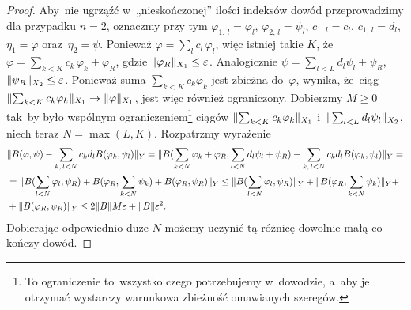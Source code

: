 \documentclass[a4paper,11pt]{article}
\begin{document}
\begin{proof}

  Aby~nie ugrząźć w~„nieskończonej” ilości indeksów dowód
  przeprowadzimy dla przypadku $n = 2$, oznaczmy przy tym
  $\varphi_{ 1,\, l } = \varphi_{ l }$, $\varphi_{ 2, \, l } = \psi_{ l }$,
  $c_{ 1, \, l } = c_{ l }$, $c_{ 1, \, l } = d_{ l }$,
  $\eta_{ 1 } = \varphi$ oraz~$\eta_{ 2 } = \psi$. Ponieważ
  $\varphi = \sum_{ l } c_{ l } \, \varphi_{ l }$, więc istniej takie $K$,
  że~$\varphi = \sum_{ k < K } c_{ k } \, \varphi_{ k } + \varphi_{ R }$, gdzie
  $\lVert{  \varphi_{ R }  }\rVert_{ X_{ 1 } } \leq \varepsilon$. Analogicznie
  $\psi = \sum_{ l < L } d_{ l } \psi_{ l } + \psi_{ R }$,
  $\lVert{  \psi_{ R }  }\rVert_{ X_{ 2 } } \leq \varepsilon$. Ponieważ suma
  $\sum_{ k < K } c_{ k } \varphi_{ k }$ jest zbieżna do~$\varphi$, wynika,
  że~ciąg
  $\lVert{  \sum_{ k < K } c_{ k } \varphi_{ k }  }\rVert_{ X_{ 1 } } \to \lVert{ 
    \varphi  }\rVert_{ X_{ 1 } }$, jest więc również ograniczony. Dobierzmy
  $M \geq 0$ tak~by było wspólnym ograniczeniem\footnote{To
    ograniczenie to~wszystko czego potrzebujemy w~dowodzie, a~aby je
    otrzymać wystarczy warunkowa zbieżność omawianych szeregów.}
  ciągów $\lVert{  \sum_{ k < K } c_{ k } \varphi_{ k }  }\rVert_{ X_{ 1 } }$
  i~$\lVert{  \sum_{ l < L } d_{ l } \psi_{ l }  }\rVert_{ X_{ 2 } }$, niech
  teraz $N = \max( L, K )$. Rozpatrzmy wyrażenie
  \begin{equation}
    \begin{split}
      \label{eq:RS-Vol-I-s02-06}
      &\Vert B( \varphi, \psi ) - \sum_{ k, \, l < N } c_{ k } d_{ l }
        B( \varphi_{ k }, \psi_{ l } ) \Vert_{ Y }
        =
        \Vert B( \sum_{ k < N } \varphi_{ k } + \varphi_{ R }, \sum_{ l < N } d_{ l } \psi_{ l }
        + \psi_{ R } ) - \sum_{ k,\, l < N } c_{ k } d_{ l }
        B( \varphi_{ k }, \psi_{ l } ) \Vert_{ Y } = \\
      &=
        \Vert B( \sum_{ l < N } \varphi_{ l }, \psi_{ R } )
        + B( \varphi_{ R }, \sum_{ k < N } \psi_{ k } )
        + B( \varphi_{ R }, \psi_{ R } ) \Vert_{ Y }
        \leq
        \Vert B( \sum_{ l < N } \varphi_{ l }, \psi_{ R } ) \Vert_{ Y }
        + \Vert B( \varphi_{ R }, \sum_{ k < N } \psi_{ k } ) \Vert_{ Y } + \\
      &+ \Vert B( \varphi_{ R }, \psi_{ R } ) \Vert_{ Y }
        \leq 2 \lVert{  B  }\rVert M \varepsilon + \lVert{  B  }\rVert \varepsilon^{ 2 }.
    \end{split}
  \end{equation}
  Dobierając odpowiednio duże $N$ możemy uczynić tą różnicę dowolnie
  małą co kończy dowód.

\end{proof}
\end{document}
